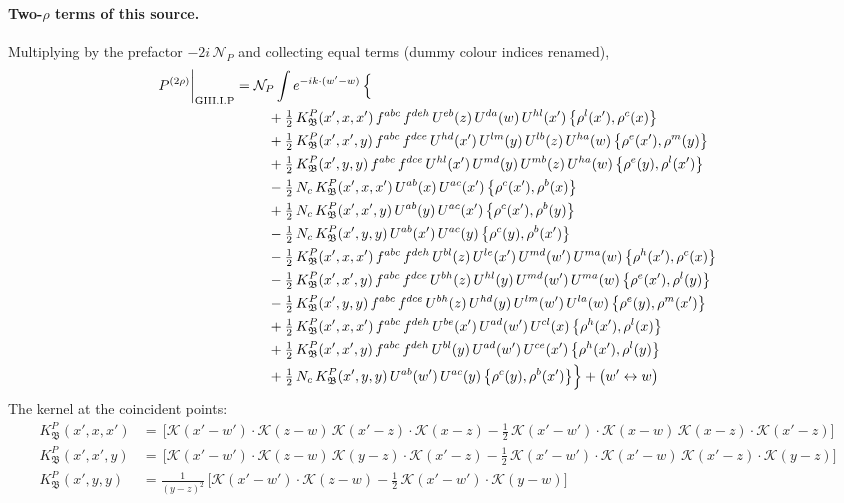 \documentclass[10pt]{article}
\numberwithin{equation}{section}
\newcommand{\KK}{\mathcal K}
\newcommand{\NP}{\mathcal N_{P}}
\begin{document}
\paragraph{Two-$\rho$ terms of this source.} Multiplying by the prefactor $-2i\,\NP$ and collecting equal terms (dummy colour indices renamed),
\begin{align}
P^{(2\rho)}\bigg|_{\rm GIII.I.P}={}&\NP\int e^{-ik\cdot(w'-w)}\,\Big\{\notag\\
&\quad +\tfrac12\,K^{P}_{\mathfrak B}(x',x,x')\,f^{abc}\,f^{deh}\,U^{eb}(z)\,U^{da}(w)\,U^{hl}(x')\,\big\{\rho^{l}(x'),\rho^{c}(x)\big\}\notag\\
&\quad +\tfrac12\,K^{P}_{\mathfrak B}(x',x',y)\,f^{abc}\,f^{dce}\,U^{hd}(x')\,U^{lm}(y)\,U^{lb}(z)\,U^{ha}(w)\,\big\{\rho^{e}(x'),\rho^{m}(y)\big\}\notag\\
&\quad +\tfrac12\,K^{P}_{\mathfrak B}(x',y,y)\,f^{abc}\,f^{dce}\,U^{hl}(x')\,U^{md}(y)\,U^{mb}(z)\,U^{ha}(w)\,\big\{\rho^{e}(y),\rho^{l}(x')\big\}\notag\\
&\quad -\tfrac12\,N_{c}\,K^{P}_{\mathfrak B}(x',x,x')\,U^{ab}(x)\,U^{ac}(x')\,\big\{\rho^{c}(x'),\rho^{b}(x)\big\}\notag\\
&\quad +\tfrac12\,N_{c}\,K^{P}_{\mathfrak B}(x',x',y)\,U^{ab}(y)\,U^{ac}(x')\,\big\{\rho^{c}(x'),\rho^{b}(y)\big\}\notag\\
&\quad -\tfrac12\,N_{c}\,K^{P}_{\mathfrak B}(x',y,y)\,U^{ab}(x')\,U^{ac}(y)\,\big\{\rho^{c}(y),\rho^{b}(x')\big\}\notag\\
&\quad -\tfrac12\,K^{P}_{\mathfrak B}(x',x,x')\,f^{abc}\,f^{deh}\,U^{bl}(z)\,U^{le}(x')\,U^{md}(w')\,U^{ma}(w)\,\big\{\rho^{h}(x'),\rho^{c}(x)\big\}\notag\\
&\quad -\tfrac12\,K^{P}_{\mathfrak B}(x',x',y)\,f^{abc}\,f^{dce}\,U^{bh}(z)\,U^{hl}(y)\,U^{md}(w')\,U^{ma}(w)\,\big\{\rho^{e}(x'),\rho^{l}(y)\big\}\notag\\
&\quad -\tfrac12\,K^{P}_{\mathfrak B}(x',y,y)\,f^{abc}\,f^{dce}\,U^{bh}(z)\,U^{hd}(y)\,U^{lm}(w')\,U^{la}(w)\,\big\{\rho^{e}(y),\rho^{m}(x')\big\}\notag\\
&\quad +\tfrac12\,K^{P}_{\mathfrak B}(x',x,x')\,f^{abc}\,f^{deh}\,U^{be}(x')\,U^{ad}(w')\,U^{cl}(x)\,\big\{\rho^{h}(x'),\rho^{l}(x)\big\}\notag\\
&\quad +\tfrac12\,K^{P}_{\mathfrak B}(x',x',y)\,f^{abc}\,f^{deh}\,U^{bl}(y)\,U^{ad}(w')\,U^{ce}(x')\,\big\{\rho^{h}(x'),\rho^{l}(y)\big\}\notag\\
&\quad +\tfrac12\,N_{c}\,K^{P}_{\mathfrak B}(x',y,y)\,U^{ab}(w')\,U^{ac}(y)\,\big\{\rho^{c}(y),\rho^{b}(x')\big\}\Big\}+\big(w'\leftrightarrow w\big)\label{eq:res-GIII.I.P}
\end{align}
The kernel at the coincident points:
\begin{align*}
K^{P}_{\mathfrak B}(x',x,x')&=\,\Big[\KK(x'-w')\cdot\KK(z-w)\,\KK(x'-z)\cdot\KK(x-z)-\frac{1}{2}\,\KK(x'-w')\cdot\KK(x-w)\,\KK(x-z)\cdot\KK(x'-z)\Big]\\K^{P}_{\mathfrak B}(x',x',y)&=\,\Big[\KK(x'-w')\cdot\KK(z-w)\,\KK(y-z)\cdot\KK(x'-z)-\frac{1}{2}\,\KK(x'-w')\cdot\KK(x'-w)\,\KK(x'-z)\cdot\KK(y-z)\Big]\\K^{P}_{\mathfrak B}(x',y,y)&=\frac{1}{(y-z)^2}\,\Big[\KK(x'-w')\cdot\KK(z-w)-\frac{1}{2}\,\KK(x'-w')\cdot\KK(y-w)\Big]
\end{align*}
\end{document}
